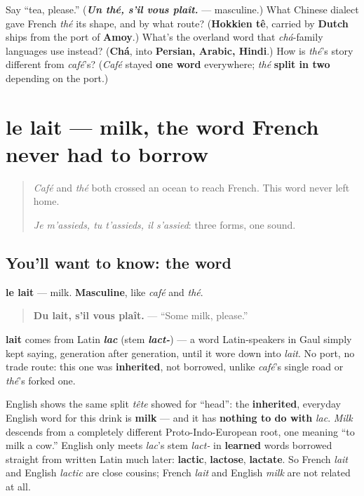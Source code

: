 \begin{tcolorbox}[breakable,colback=teal!4,colframe=teal!35!black,title={Before you move on}]
Say \textquotedblleft{}tea, please.\textquotedblright{} (\emph{\textbf{Un thé, s'il vous plaît.}} — masculine.) What Chinese dialect gave French \emph{thé} its shape, and by what route? (\textbf{Hokkien tê}, carried by \textbf{Dutch} ships from the port of \textbf{Amoy}.) What's the overland word that \emph{chá}-family languages use instead? (\textbf{Chá}, into \textbf{Persian, Arabic, Hindi}.) How is \emph{thé}'s story different from \emph{café}'s? (\emph{Café} stayed \textbf{one word} everywhere; \emph{thé} \textbf{split in two} depending on the port.)
\end{tcolorbox}
\section[le lait]{le lait — milk, the word French never had to borrow}

\label{lesson:FR-C28-lait}



\begin{quote}
\emph{Café} and \emph{thé} both crossed an ocean to reach French. This word never left home.

\emph{Je m'assieds, tu t'assieds, il s'assied}: three forms, one sound.
\end{quote}

\subsection*{You'll want to know: the word}
\textbf{le lait} — milk. \textbf{Masculine}, like \emph{café} and \emph{thé}.

\begin{quote}
\textbf{Du lait, s'il vous plaît.} — \textquotedblleft{}Some milk, please.\textquotedblright{}
\end{quote}

\begin{cousinweb}
\textbf{lait} comes from Latin \emph{\textbf{lac}} (stem \emph{\textbf{lact-}}) — a word Latin-speakers in Gaul simply kept saying, generation after generation, until it wore down into \emph{lait}. No port, no trade route: this one was \textbf{inherited}, not borrowed, unlike \emph{café}'s single road or \emph{thé}'s forked one.

English shows the same split \emph{tête} showed for \textquotedblleft{}head\textquotedblright{}: the \textbf{inherited}, everyday English word for this drink is \textbf{milk} — and it has \textbf{nothing to do with} \emph{lac}. \emph{Milk} descends from a completely different Proto-Indo-European root, one meaning \textquotedblleft{}to milk a cow.\textquotedblright{} English only meets \emph{lac}'s stem \emph{lact-} in \textbf{learned} words borrowed straight from written Latin much later: \textbf{lactic}, \textbf{lactose}, \textbf{lactate}. So French \emph{lait} and English \emph{lactic} are close cousins; French \emph{lait} and English \emph{milk} are not related at all.
\end{cousinweb}

